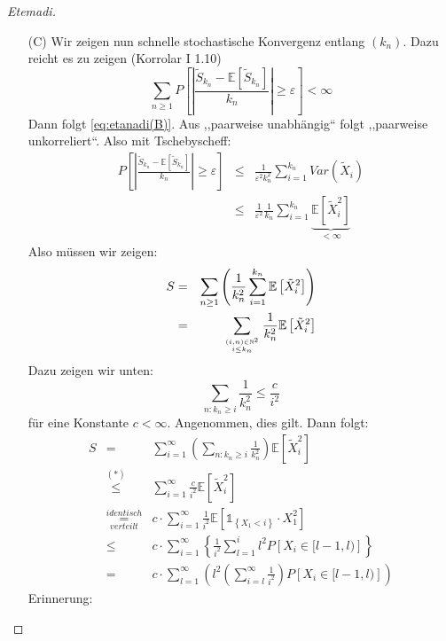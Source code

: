 \documentclass[10pt,a4paper]{report}
\numberwithin{equation}{section}
\numberwithin{figure}{section}
\theoremstyle{plain}
\theoremstyle{definition}
\theoremstyle{remark}
\theoremstyle{plain}
\newcommand{\1}{ \mathbb{1} } %
\begin{document}
\begin{proof}[Etemadi]
\begin{itemize}
  \item [{(C)}] Wir zeigen nun schnelle stochastische Konvergenz entlang
    $\left(k_{n}\right)$. Dazu reicht es zu zeigen (Korrolar I 1.10)
    \[
    \sum_{n\geq1}P\left[\left|\frac{\tilde{S}_{k_{n}}-\mathbb{E}\left[\tilde{S}_{k_{n}}\right]}{k_{n}}\right|\geq\varepsilon\right]<\infty
    \]
    Dann folgt \ref{eq:etanadi(B)}. Aus ,,paarweise unabhängig`` folgt
    ,,paarweise unkorreliert``. Also mit Tschebyscheff: 
    \begin{eqnarray*}
      P\left[\left|\frac{\tilde{S}_{k_{n}}-\mathbb{E}\left[\tilde{S}_{k_{n}}\right]}{k_{n}}\right|\geq\varepsilon\right] & \leq & \frac{1}{\varepsilon^{2}k_{n}^{2}}\sum_{i=1}^{k_{n}}Var\left(\tilde{X}_{i}\right)\\
      & \leq & \frac{1}{\varepsilon^{2}}\frac{1}{k_{n}}\sum_{i=1}^{k_{n}}\underset{<\infty}{\underbrace{\mathbb{E}\left[\tilde{X}_{i}^{2}\right]}}
    \end{eqnarray*}
    Also müssen wir zeigen:
    \begin{eqnarray*}
      S & = & \sum_{n\geq1}\left(\frac{1}{k_{n}^{2}}\sum_{i=1}^{k_{n}}\mathbb{E}\left[\tilde{X}_{i}^{2}\right]\right)\\
      & = & \sum_{{\left(i,n\right)\in\mathbb{N}^{2}\atop i\leq k_{n}}}\frac{1}{k_{n}^{2}}\mathbb{E}\left[\tilde{X}_{i}^{2}\right]
    \end{eqnarray*}
    Dazu zeigen wir unten:
    \[
    \sum_{n:k_{n}\geq i}\frac{1}{k_{n}^{2}}\leq\frac{c}{i^{2}}
    \]
    für eine Konstante $c<\infty$. Angenommen, dies gilt. Dann folgt:
    \begin{eqnarray}
      S & = & \sum_{i=1}^{\infty}\left(\sum_{n:k_{n}\geq i}\frac{1}{k_{n}^{2}}\right)\mathbb{E}\left[\tilde{X}_{i}^{2}\right]\nonumber \\
      & \overset{(*)}{\leq} & \sum_{i=1}^{\infty}\frac{c}{i^{2}}\mathbb{E}\left[\tilde{X}_{i}^{2}\right]\label{eq:etanadi(C)}\\
      & \overset{identisch}{\underset{verteilt}{=}} & c\cdot\sum_{i=1}^{\infty}\frac{1}{i^{2}}\mathbb{E}\left[\1_{\left\{ X_{1}<i\right\} }\cdot X_{1}^{2}\right]\nonumber \\
      & \leq & c\cdot\sum_{i=1}^{\infty}\left\{ \frac{1}{i^{2}}\sum_{l=1}^{i}l^{2}P\left[X_{i}\in[l-1,l)\right]\right\} \nonumber \\
      & = & c\cdot\sum_{l=1}^{\infty}\left(l^{2}\left(\sum_{i=l}^{\infty}\frac{1}{i^{2}}\right)P\left[X_{i}\in[l-1,l)\right]\right)\nonumber 
    \end{eqnarray}
    Erinnerung:

\end{itemize}
\end{proof}
\end{document}
